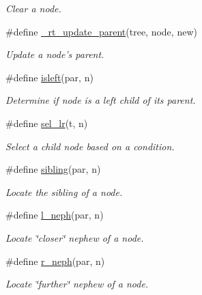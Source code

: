 \begin{CompactItemize}
\begin{CompactList}\small\item\em Clear a node. \item\end{CompactList}\item 
\#define \hyperlink{group__dbprim__rbtree_ga47}{\_\-rt\_\-update\_\-parent}(tree, node, new)
\begin{CompactList}\small\item\em Update a node's parent. \item\end{CompactList}\item 
\#define \hyperlink{group__dbprim__rbtree_ga48}{isleft}(par, n)
\begin{CompactList}\small\item\em Determine if node is a left child of its parent. \item\end{CompactList}\item 
\#define \hyperlink{group__dbprim__rbtree_ga49}{sel\_\-lr}(t, n)
\begin{CompactList}\small\item\em Select a child node based on a condition. \item\end{CompactList}\item 
\#define \hyperlink{group__dbprim__rbtree_ga50}{sibling}(par, n)
\begin{CompactList}\small\item\em Locate the sibling of a node. \item\end{CompactList}\item 
\#define \hyperlink{group__dbprim__rbtree_ga51}{l\_\-neph}(par, n)
\begin{CompactList}\small\item\em Locate \char`\"{}closer\char`\"{} nephew of a node. \item\end{CompactList}\item 
\#define \hyperlink{group__dbprim__rbtree_ga52}{r\_\-neph}(par, n)
\begin{CompactList}\small\item\em Locate \char`\"{}further\char`\"{} nephew of a node. \item\end{CompactList}\end{CompactItemize}
